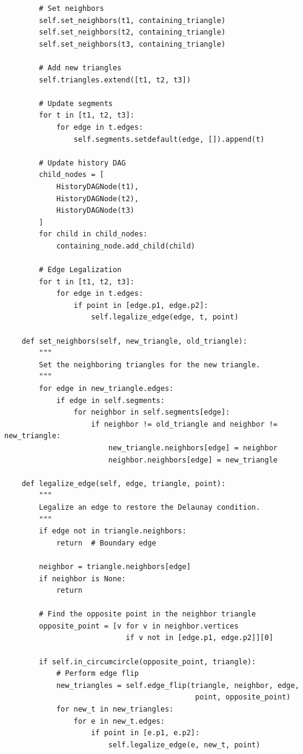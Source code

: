 \documentclass{article}
\begin{document}
\begin{verbatim}
        # Set neighbors
        self.set_neighbors(t1, containing_triangle)
        self.set_neighbors(t2, containing_triangle)
        self.set_neighbors(t3, containing_triangle)

        # Add new triangles
        self.triangles.extend([t1, t2, t3])

        # Update segments
        for t in [t1, t2, t3]:
            for edge in t.edges:
                self.segments.setdefault(edge, []).append(t)

        # Update history DAG
        child_nodes = [
            HistoryDAGNode(t1),
            HistoryDAGNode(t2),
            HistoryDAGNode(t3)
        ]
        for child in child_nodes:
            containing_node.add_child(child)

        # Edge Legalization
        for t in [t1, t2, t3]:
            for edge in t.edges:
                if point in [edge.p1, edge.p2]:
                    self.legalize_edge(edge, t, point)

    def set_neighbors(self, new_triangle, old_triangle):
        """
        Set the neighboring triangles for the new triangle.
        """
        for edge in new_triangle.edges:
            if edge in self.segments:
                for neighbor in self.segments[edge]:
                    if neighbor != old_triangle and neighbor != new_triangle:
                        new_triangle.neighbors[edge] = neighbor
                        neighbor.neighbors[edge] = new_triangle

    def legalize_edge(self, edge, triangle, point):
        """
        Legalize an edge to restore the Delaunay condition.
        """
        if edge not in triangle.neighbors:
            return  # Boundary edge

        neighbor = triangle.neighbors[edge]
        if neighbor is None:
            return

        # Find the opposite point in the neighbor triangle
        opposite_point = [v for v in neighbor.vertices 
                            if v not in [edge.p1, edge.p2]][0]

        if self.in_circumcircle(opposite_point, triangle):
            # Perform edge flip
            new_triangles = self.edge_flip(triangle, neighbor, edge, 
                                            point, opposite_point)
            for new_t in new_triangles:
                for e in new_t.edges:
                    if point in [e.p1, e.p2]:
                        self.legalize_edge(e, new_t, point)


\end{verbatim}
\end{document}
